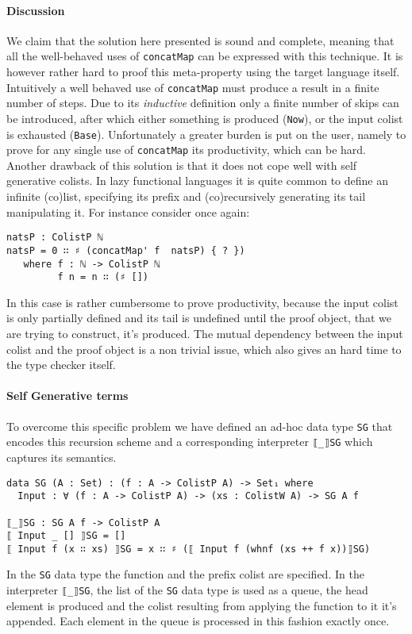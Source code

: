 \documentclass[10pt,a4paper]{article}
\begin{document}
\paragraph{Discussion}
We claim that the solution here presented is sound and complete, meaning that all the well-behaved uses of \texttt{concatMap} can be expressed with this technique. It is however rather hard to proof this meta-property using the target language itself. Intuitively a well behaved use of \texttt{concatMap} must produce a result in a finite number of steps. Due to its \emph{inductive} definition only a finite number of skips can be introduced, after which either something is produced (\texttt{Now}), or the input colist is exhausted (\texttt{Base}).
Unfortunately a greater burden is put on the user, namely to prove for any single use of \texttt{concatMap} its productivity, which can be hard. %
Another drawback of this solution is that it does not cope well with self generative colists. In lazy functional languages it is quite common to define an infinite (co)list, specifying its prefix and (co)recursively generating its tail manipulating it. For instance consider once again:
\begin{verbatim}
natsP : ColistP ℕ
natsP = 0 ∷ ♯ (concatMap' f  natsP) { ? })
   where f : ℕ -> ColistP ℕ
         f n = n ∷ (♯ [])
\end{verbatim}
In this case is rather cumbersome to prove productivity, because the input colist is only partially defined and its tail is undefined until the proof object, that we are trying to construct, it's produced.
The mutual dependency between the input colist and the proof object is a non trivial issue, which also gives an hard time to the type checker itself.

\paragraph{Self Generative terms}
To overcome this specific problem we have defined an ad-hoc data type \texttt{SG} that encodes this recursion scheme and a corresponding interpreter \texttt{⟦\_⟧SG} which captures its semantics. 
\begin{verbatim}
data SG (A : Set) : (f : A -> ColistP A) -> Set₁ where
  Input : ∀ (f : A -> ColistP A) -> (xs : ColistW A) -> SG A f
  
⟦_⟧SG : SG A f -> ColistP A
⟦ Input _ [] ⟧SG = []
⟦ Input f (x ∷ xs) ⟧SG = x ∷ ♯ (⟦ Input f (whnf (xs ++ f x))⟧SG)
\end{verbatim}
In the \texttt{SG} data type the function and the prefix colist are specified.
In the interpreter \texttt{⟦\_⟧SG}, the list of the \texttt{SG} data type is used as a queue, the head element is produced and the colist resulting from applying the function to it it's appended. Each element in the queue is processed in this fashion exactly once.
\end{document}

